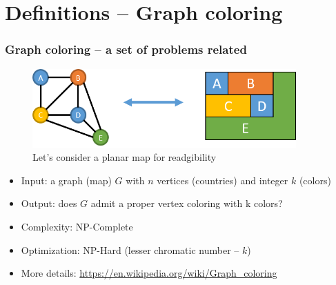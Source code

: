 \documentclass{beamer}
\begin{document}
\section{Definitions -- Graph coloring}
\begin{frame}[fragile] 
		\frametitle{Graph coloring -- a set of problems related}
	
\begin{figure}[tbp]
  \centering
	 \includegraphics[width=0.9\textwidth , height=0.3\textheight] {graph_coloring_equivalence.png}
  \caption{Let's consider a planar map for readgibility}
	
	\end{figure}
{\small	
\begin{block}{}
  \begin{itemize}

  \item Input: a graph (map) $G$ with $n$ vertices (countries) and  integer $k$ (colors)
  \item Output: does $G$ admit a proper vertex coloring with k colors?
  \item Complexity:	NP-Complete
  \item Optimization: NP-Hard (lesser chromatic number -- $k$)
  \item More details: \url{https://en.wikipedia.org/wiki/Graph_coloring}

    \end{itemize}
 \end{block}
}

\end{frame}
\end{document}
